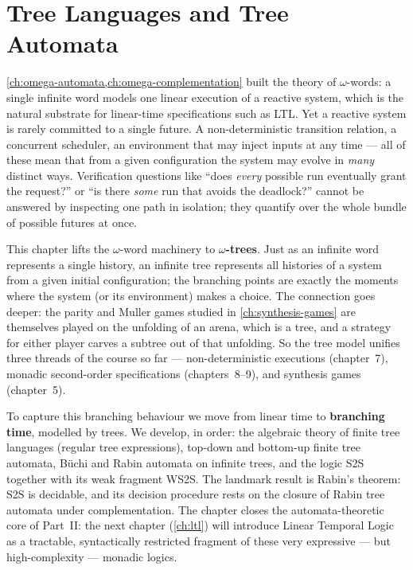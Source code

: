 
\chapter{Tree Languages and Tree Automata}
\label{ch:tree-languages-automata}

\cref{ch:omega-automata,ch:omega-complementation} built the theory of $\omega$-words: a single infinite word models one linear execution of a reactive system, which is the natural substrate for linear-time specifications such as LTL. Yet a reactive system is rarely committed to a single future. A non-deterministic transition relation, a concurrent scheduler, an environment that may inject inputs at any time --- all of these mean that from a given configuration the system may evolve in \emph{many} distinct ways. Verification questions like ``does \emph{every} possible run eventually grant the request?'' or ``is there \emph{some} run that avoids the deadlock?'' cannot be answered by inspecting one path in isolation; they quantify over the whole bundle of possible futures at once.

This chapter lifts the $\omega$-word machinery to \textbf{$\omega$-trees}. Just as an infinite word represents a single history, an infinite tree represents all histories of a system from a given initial configuration; the branching points are exactly the moments where the system (or its environment) makes a choice. The connection goes deeper: the parity and Muller games studied in \cref{ch:synthesis-games} are themselves played on the unfolding of an arena, which is a tree, and a strategy for either player carves a subtree out of that unfolding. So the tree model unifies three threads of the course so far --- non-deterministic executions (chapter~7), monadic second-order specifications (chapters~8--9), and synthesis games (chapter~5).

To capture this branching behaviour we move from linear time to \textbf{branching time}, modelled by trees. We develop, in order: the algebraic theory of finite tree languages (regular tree expressions), top-down and bottom-up finite tree automata, Büchi and Rabin automata on infinite trees, and the logic S2S together with its weak fragment WS2S. The landmark result is Rabin's theorem: S2S is decidable, and its decision procedure rests on the closure of Rabin tree automata under complementation. The chapter closes the automata-theoretic core of Part~II: the next chapter (\cref{ch:ltl}) will introduce Linear Temporal Logic as a tractable, syntactically restricted fragment of these very expressive --- but high-complexity --- monadic logics.

